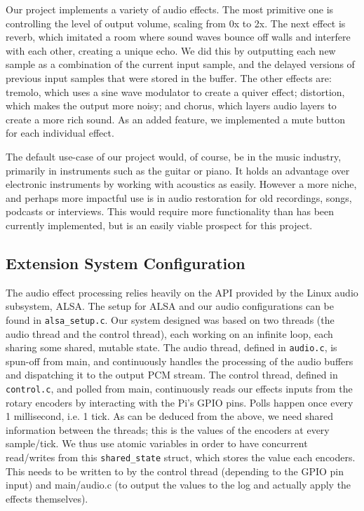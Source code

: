 \documentclass{article}
\begin{document}
Our project implements a variety of audio effects. The most primitive one is controlling the level of output volume, scaling from 0x to 2x. The next effect is  reverb, which imitated a room where sound waves bounce off walls and interfere with each other, creating a unique echo. We did this by outputting each new sample as a combination of the current input sample, and the delayed versions of previous input samples that were stored in the buffer. The other effects are: tremolo, which uses a sine wave modulator to create a quiver effect; distortion, which makes the output more noisy; and chorus, which layers audio layers to create a more rich sound. As an added feature, we implemented a mute button for each individual effect.  

The default use-case of our project would, of course, be in the music industry, primarily in instruments such as the guitar or piano. It holds an advantage over electronic instruments by working with acoustics as easily. However a more niche, and perhaps more impactful use is in audio restoration for old recordings, songs, podcasts or interviews. This would require more functionality than has been currently implemented, but is an easily viable prospect for this project.

\subsection{Extension System Configuration}

The audio effect processing relies heavily on the API provided by the Linux audio subsystem, ALSA. The setup for ALSA and our audio configurations can be found in \verb|alsa_setup.c|. Our system designed was based on two threads (the audio thread and the control thread), each working on an infinite loop, each sharing some shared, mutable state. The audio thread, defined in \verb|audio.c|, is spun-off from main, and continuously handles the processing of the audio buffers and dispatching it to the output PCM stream. The control thread, defined in \verb|control.c|, and polled from main, continuously reads our effects inputs from the rotary encoders by interacting with the Pi's GPIO pins. Polls happen once every 1 millisecond, i.e. 1 tick. As can be deduced from the above, we need shared information between the threads; this is the values of the encoders at every sample/tick. We thus use atomic variables in order to have concurrent read/writes from this \verb|shared_state| struct, which stores the value each encoders. This needs to be written to by the control thread (depending to the GPIO pin input) and main/audio.c (to output the values to the log and actually apply the effects themselves).
\end{document}

